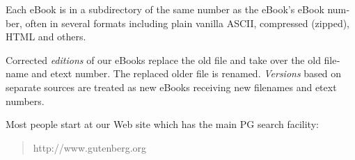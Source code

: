 \documentclass[a5paper]{book}
\begin{document}
\begin{german}
\begin{english}
\begin{pgfooter_env}
Each eBook is in a subdirectory of the same number as the eBook’s
eBook number, often in several formats including plain vanilla ASCII,
compressed (zipped), HTML and others.\par

Corrected {\itshape{editions}} of our eBooks replace the old file and take over
the old filename and etext number. The replaced older file is
renamed. {\itshape{Versions}} based on separate sources are treated as new
eBooks receiving new filenames and etext numbers.\par

Most people start at our Web site which has the main PG search
facility:\par

\begin{quotation}
{{\noindent}http://www.gutenberg.org}\par
\end{quotation}


\end{pgfooter_env}
\end{english}
\end{german}
\end{document}
